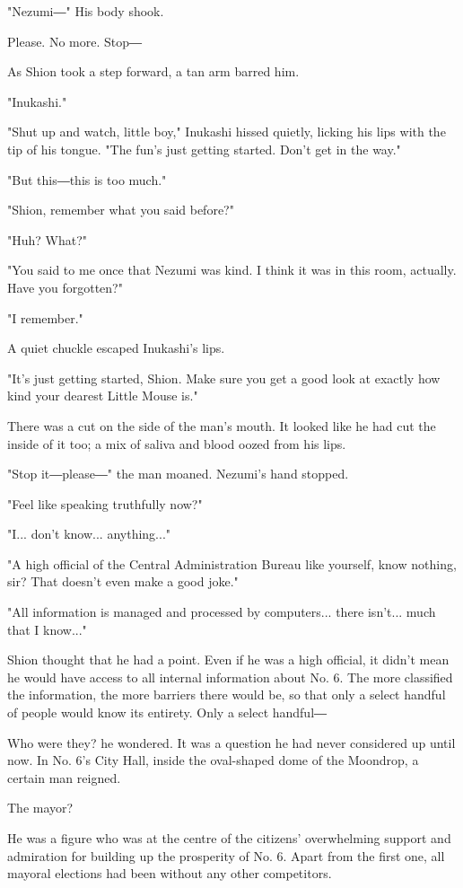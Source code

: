 "Nezumi―" His body shook.

Please. No more. Stop―

As Shion took a step forward, a tan arm barred him.

"Inukashi."

"Shut up and watch, little boy," Inukashi hissed quietly, licking his
lips with the tip of his tongue. "The fun's just getting started. Don't
get in the way."

"But this―this is too much."

"Shion, remember what you said before?"

"Huh? What?"

"You said to me once that Nezumi was kind. I think it was in this room,
actually. Have you forgotten?"

"I remember."

A quiet chuckle escaped Inukashi's lips.

"It's just getting started, Shion. Make sure you get a good look at
exactly how kind your dearest Little Mouse is."

There was a cut on the side of the man's mouth. It looked like he had
cut the inside of it too; a mix of saliva and blood oozed from his lips.

"Stop it―please―" the man moaned. Nezumi's hand stopped.

"Feel like speaking truthfully now?"

"I... don't know... anything..."

"A high official of the Central Administration Bureau like yourself,
know nothing, sir? That doesn't even make a good joke."

"All information is managed and processed by computers... there isn't...
much that I know..."

Shion thought that he had a point. Even if he was a high official, it
didn't mean he would have access to all internal information about No.
6. The more classified the information, the more barriers there would
be, so that only a select handful of people would know its entirety.
Only a select handful―

Who were they? he wondered. It was a question he had never considered up
until now. In No. 6's City Hall, inside the oval-shaped dome of the
Moondrop, a certain man reigned.

The mayor?

He was a figure who was at the centre of the citizens' overwhelming
support and admiration for building up the prosperity of No. 6. Apart
from the first one, all mayoral elections had been without any other
competitors.

